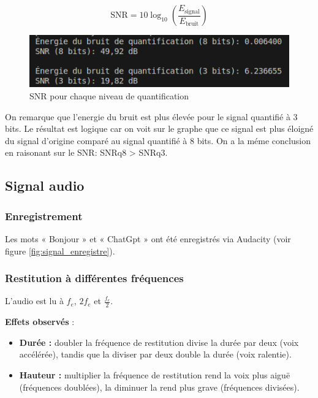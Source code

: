 \[
\text{SNR} = 10 \log_{10} \left(\frac{E_{\text{signal}}}{E_{\text{bruit}}} \right)
\]

\begin{figure}[!h]
\centering
\includegraphics{screenshots/snr_quantification.png}
\caption{SNR pour chaque niveau de quantification}
\end{figure}

On remarque que l'energie du bruit est plus élevée pour le signal quantifié à 3 bits. Le résultat est logique
car on voit sur le graphe que ce signal est plus éloigné du signal d'origine comparé au signal quantifié à 8 bits.
On a la méme conclusion en raisonant sur le SNR: SNRq8 > SNRq3.

\subsection{Signal audio}

\subsubsection{Enregistrement}

Les mots « Bonjour » et « ChatGpt » ont été enregistrés via Audacity (voir figure \ref{fig:signal_enregistre}).

\subsubsection{Restitution à différentes fréquences}

L’audio est lu à \( f_e \), \( 2 f_e \) et \( \frac{f_e}{2} \). 

\textbf{Effets observés} :

\begin{itemize}
    \item \textbf{Durée :} doubler la fréquence de restitution divise la durée par deux (voix accélérée), tandis que la diviser par deux double la durée (voix ralentie).
    \item \textbf{Hauteur :} multiplier la fréquence de restitution rend la voix plus aiguë (fréquences doublées), la diminuer la rend plus grave (fréquences divisées).
\end{itemize}

